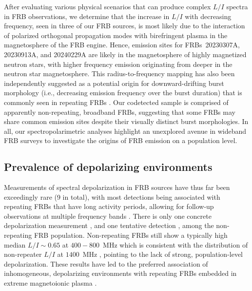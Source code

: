 \documentclass[twocolumn, linenumbers]{aastex701}
\begin{document}
After evaluating various physical scenarios that can produce complex $L/I$ spectra in FRB observations, we determine that the increase in $L/I$ with decreasing frequency, seen in three of our FRB sources, is most likely due to the interaction of polarized orthogonal propagation modes with birefringent plasma in the magnetosphere of the FRB engine. Hence, emission sites for FRBs~20230307A, 20230913A, and 20240229A are likely in the magnetosphere of highly magnetized neutron stars, with higher frequency emission originating from deeper in the neutron star magnetosphere. This radius-to-frequency mapping has also been independently suggested as a potential origin for downward-drifting burst morphology (i.e., decreasing emission frequency over the burst duration) that is commonly seen in repeating FRBs \citep[e.g.,][]{2019ApJ...876L..23H, 2020ApJ...889..135L, 2022MNRAS.509.5679T}. Our codetected sample is comprised of apparently non-repeating, broadband FRBs, suggesting that some FRBs may share common emission sites despite their visually distinct burst morphologies. In all, our spectropolarimetric analyses highlight an unexplored avenue in wideband FRB surveys to investigate the origins of FRB emission on a population level.

\subsection{Prevalence of depolarizing environments} \label{sec:discussion_depol}
Measurements of spectral depolarization in FRB sources have thus far been exceedingly rare (9 in total), with most detections being associated with repeating FRBs that have long activity periods, allowing for follow-up observations at multiple frequency bands \citep{2022Sci...375.1266F, 2026ApJ..1000L..53P}. There is only one concrete depolarization measurement \citep{2025MNRAS.tmp.1894U}, and one tentative detection \citep{2024ApJ...968...50P}, among the non-repeating FRB population. Non-repeating FRBs still show a typically high median $L/I\sim0.65$ at $400-800$~MHz which is consistent with the distribution of non-repeater $L/I$ at $1400$~MHz \citep{2024ApJ...968...50P}, pointing to the lack of strong, population-level depolarization. These results have led to the preferred association of inhomogeneous, depolarizing environments with repeating FRBs embedded in extreme magnetoionic plasma \citep{2020ApJ...895....7Y, 2022ApJ...928L..16Y, 2026arXiv260317615Y}.
\end{document}
